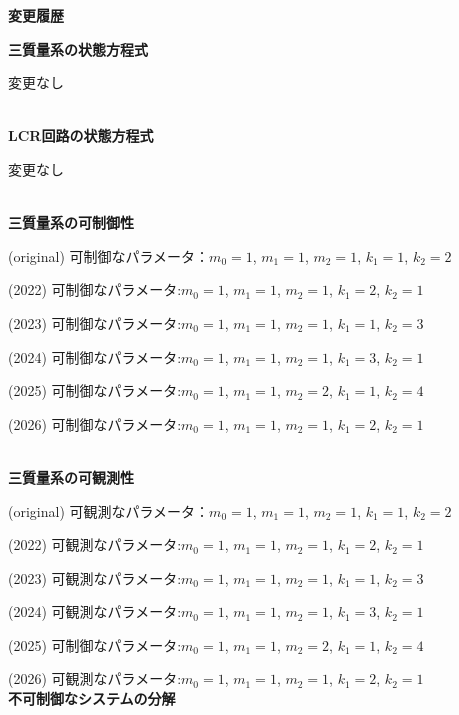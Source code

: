 



\begin{center}
	{\Large \bf 変更履歴}
\end{center}
	

\noindent
{\bf 三質量系の状態方程式}

変更なし

\ \\ \noindent
{\bf LCR回路の状態方程式}

変更なし

\ \\ \noindent
{\bf 三質量系の可制御性}

(original) 可制御なパラメータ：$m_0=1$, $m_1=1$, $m_2=1$, $k_1=1$, $k_2=2$

(2022) 可制御なパラメータ:$m_0=1$, $m_1=1$, $m_2=1$, {\color{red} $k_1=2$, $k_2=1$}

(2023) 可制御なパラメータ:$m_0=1$, $m_1=1$, $m_2=1$, $k_1=1$, {\color{red} $k_2=3$}

(2024) 可制御なパラメータ:$m_0=1$, $m_1=1$, $m_2=1$, {\color{red} $k_1=3$, $k_2=1$}

(2025) 可制御なパラメータ:$m_0=1$, $m_1=1$, {\color{red} $m_2=2$}, $k_1=1$, {\color{red} $k_2=4$}

(2026) 可制御なパラメータ:$m_0=1$, $m_1=1$, $m_2=1$, {\color{red} $k_1=2$, $k_2=1$}

\ \\ \noindent
{\bf 三質量系の可観測性}

(original) 可観測なパラメータ：$m_0=1$, $m_1=1$, $m_2=1$, $k_1=1$, $k_2=2$

(2022) 可観測なパラメータ:$m_0=1$, $m_1=1$, $m_2=1$, {\color{red} $k_1=2$, $k_2=1$}

(2023) 可観測なパラメータ:$m_0=1$, $m_1=1$, $m_2=1$, $k_1=1$, {\color{red} $k_2=3$}

(2024) 可観測なパラメータ:$m_0=1$, $m_1=1$, $m_2=1$, {\color{red} $k_1=3$, $k_2=1$}

(2025) 可制御なパラメータ:$m_0=1$, $m_1=1$, {\color{red} $m_2=2$}, $k_1=1$, {\color{red} $k_2=4$}

(2026) 可観測なパラメータ:$m_0=1$, $m_1=1$, $m_2=1$, {\color{red} $k_1=2$, $k_2=1$}
\ \\ \noindent
{\bf 不可制御なシステムの分解}

